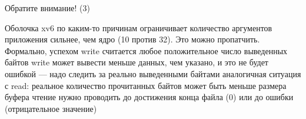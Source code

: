\documentclass{../../slides-style}
\begin{document}
    \begin{frame}{Обратите внимание! (3)}
        \begin{outline}
            \1 Оболочка xv6 по каким-то причинам ограничивает количество аргументов приложения сильнее, чем ядро (10 против 32). Это можно пропатчить.
            \1 Формально, успехом write считается любое положительное число выведенных байтов
                \2 write может вывести меньше данных, чем указано, и это не будет ошибкой --- надо следить за реально выведенными байтами
            \1 аналогичная ситуация с read: реальное количество прочитанных байтов может быть меньше размера буфера 
                \2 чтение нужно проводить до достижения конца файла (0) или до ошибки (отрицательное значение)
        \end{outline}
    \end{frame}
\end{document}
